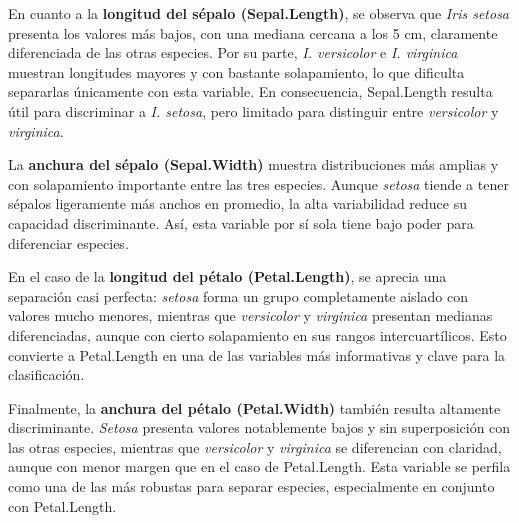 \documentclass[
  spanish,
  11pt,
  a4paper,
  DIV=11,
  numbers=noendperiod]{scrartcl}
\begin{document}
En cuanto a la \textbf{longitud del sépalo (Sepal.Length)}, se observa
que \emph{Iris setosa} presenta los valores más bajos, con una mediana
cercana a los 5 cm, claramente diferenciada de las otras especies. Por
su parte, \emph{I. versicolor} e \emph{I. virginica} muestran longitudes
mayores y con bastante solapamiento, lo que dificulta separarlas
únicamente con esta variable. En consecuencia, Sepal.Length resulta útil
para discriminar a \emph{I. setosa}, pero limitado para distinguir entre
\emph{versicolor} y \emph{virginica}.

La \textbf{anchura del sépalo (Sepal.Width)} muestra distribuciones más
amplias y con solapamiento importante entre las tres especies. Aunque
\emph{setosa} tiende a tener sépalos ligeramente más anchos en promedio,
la alta variabilidad reduce su capacidad discriminante. Así, esta
variable por sí sola tiene bajo poder para diferenciar especies.

En el caso de la \textbf{longitud del pétalo (Petal.Length)}, se aprecia
una separación casi perfecta: \emph{setosa} forma un grupo completamente
aislado con valores mucho menores, mientras que \emph{versicolor} y
\emph{virginica} presentan medianas diferenciadas, aunque con cierto
solapamiento en sus rangos intercuartílicos. Esto convierte a
Petal.Length en una de las variables más informativas y clave para la
clasificación.

Finalmente, la \textbf{anchura del pétalo (Petal.Width)} también resulta
altamente discriminante. \emph{Setosa} presenta valores notablemente
bajos y sin superposición con las otras especies, mientras que
\emph{versicolor} y \emph{virginica} se diferencian con claridad, aunque
con menor margen que en el caso de Petal.Length. Esta variable se
perfila como una de las más robustas para separar especies,
especialmente en conjunto con Petal.Length.
\end{document}
